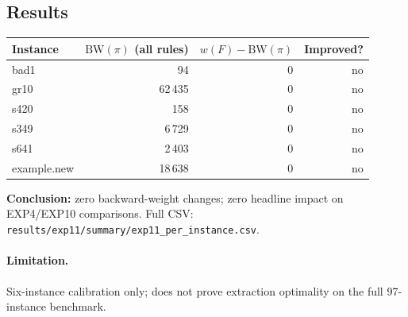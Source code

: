 \subsection{Results}
\begin{center}
\begin{tabular}{lrrr}
\toprule
Instance & $\mathrm{BW}(\pi)$ (all rules) & $w(F)-\mathrm{BW}(\pi)$ & Improved? \\
\midrule
bad1 & 94 & 0 & no \\
gr10 & 62\,435 & 0 & no \\
s420 & 158 & 0 & no \\
s349 & 6\,729 & 0 & no \\
s641 & 2\,403 & 0 & no \\
example.new & 18\,638 & 0 & no \\
\bottomrule
\end{tabular}
\end{center}

\textbf{Conclusion:} zero backward-weight changes; zero headline impact on EXP4/EXP10 comparisons. Full CSV: \texttt{results/exp11/summary/exp11\_per\_instance.csv}.

\paragraph{Limitation.} Six-instance calibration only; does not prove extraction optimality on the full 97-instance benchmark.
